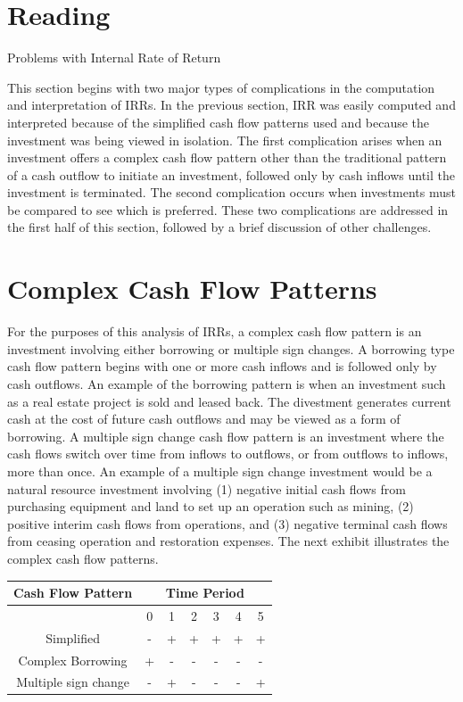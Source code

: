 \documentclass[11pt]{article}
\begin{document}
\section*{Reading}
Problems with Internal Rate of Return

This section begins with two major types of complications in the computation and interpretation of IRRs. In the previous section, IRR was easily computed and interpreted because of the simplified cash flow patterns used and because the investment was being viewed in isolation. The first complication arises when an investment offers a complex cash flow pattern other than the traditional pattern of a cash outflow to initiate an investment, followed only by cash inflows until the investment is terminated. The second complication occurs when investments must be compared to see which is preferred. These two complications are addressed in the first half of this section, followed by a brief discussion of other challenges.

\section*{Complex Cash Flow Patterns}
For the purposes of this analysis of IRRs, a complex cash flow pattern is an investment involving either borrowing or multiple sign changes. A borrowing type cash flow pattern begins with one or more cash inflows and is followed only by cash outflows. An example of the borrowing pattern is when an investment such as a real estate project is sold and leased back. The divestment generates current cash at the cost of future cash outflows and may be viewed as a form of borrowing. A multiple sign change cash flow pattern is an investment where the cash flows switch over time from inflows to outflows, or from outflows to inflows, more than once. An example of a multiple sign change investment would be a natural resource investment involving (1) negative initial cash flows from purchasing equipment and land to set up an operation such as mining, (2) positive interim cash flows from operations, and (3) negative terminal cash flows from ceasing operation and restoration expenses. The next exhibit illustrates the complex cash flow patterns.

\begin{center}
\begin{tabular}{|c|c|c|c|c|c|c|}
\hline
\multirow[b]{2}{*}{Cash Flow Pattern} & \multicolumn{6}{|c|}{Time Period} \\
\hline
 & 0 & 1 & 2 & 3 & 4 & 5 \\
\hline
Simplified & - & + & + & + & + & + \\
\hline
Complex Borrowing & + & - & - & - & - & - \\
\hline
Multiple sign change & - & + & - & - & - & + \\
\hline
\end{tabular}
\end{center}
\end{document}
